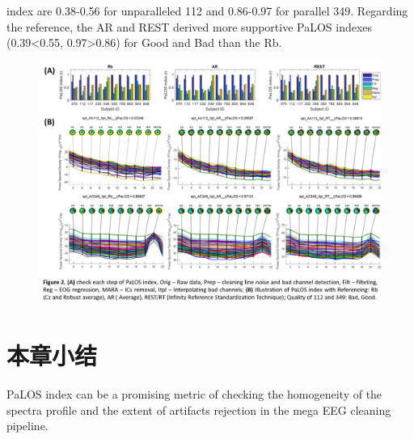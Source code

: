 index are 0.38-0.56 for unparalleled 112 and 0.86-0.97 for parallel 349. Regarding the reference, the AR and
REST derived more supportive PaLOS indexes (0.39<0.55, 0.97>0.86) for Good and Bad than the Rb.
\begin{figure}[!ht]
	\includegraphics[width=15cm]{pic/palos/figure2.png}
	\caption{}
	\label{fig2}
\end{figure}
\section{本章小结}
PaLOS index can be a promising metric of checking the homogeneity of the spectra profile and the extent of
artifacts rejection in the mega EEG cleaning pipeline.